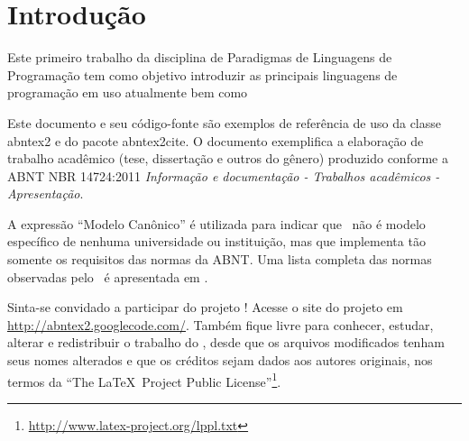 \documentclass[
    12pt,               %
    openright,          %
    twoside,            %
    a4paper,            %
    brazil              %
    ]{abntex2}
\begin{document}
\frenchspacing 


\imprimircapa

\imprimirfolhaderosto*

\clearpage
{}
\tableofcontents*
\cleardoublepage



\textual

\chapter*[Introdução]{Introdução}

Este primeiro trabalho da disciplina de Paradigmas de Linguagens de Programação
tem como objetivo introduzir as principais linguagens de programação em uso 
atualmente bem como  

Este documento e seu código-fonte são exemplos de referência de uso da classe
\textsf{abntex2} e do pacote \textsf{abntex2cite}. O documento 
exemplifica a elaboração de trabalho acadêmico (tese, dissertação e outros do
gênero) produzido conforme a ABNT NBR 14724:2011 \emph{Informação e documentação
- Trabalhos acadêmicos - Apresentação}.

A expressão ``Modelo Canônico'' é utilizada para indicar que \abnTeX\ não é
modelo específico de nenhuma universidade ou instituição, mas que implementa tão
somente os requisitos das normas da ABNT. Uma lista completa das normas
observadas pelo \abnTeX\ é apresentada em .

Sinta-se convidado a participar do projeto \abnTeX! Acesse o site do projeto em
\url{http://abntex2.googlecode.com/}. Também fique livre para conhecer,
estudar, alterar e redistribuir o trabalho do \abnTeX, desde que os arquivos
modificados tenham seus nomes alterados e que os créditos sejam dados aos
autores originais, nos termos da ``The \LaTeX\ Project Public
License''\footnote{\url{http://www.latex-project.org/lppl.txt}}.
\end{document}
